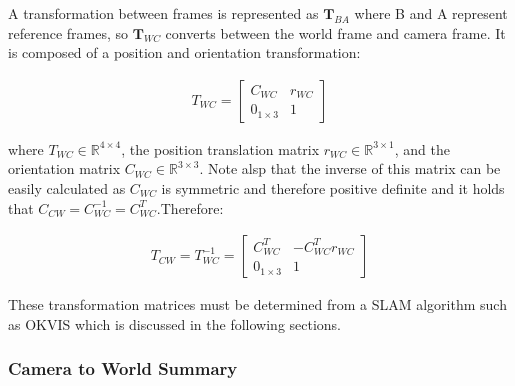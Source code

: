 \documentclass[a4paper,11pt,notitlepage]{article}
\begin{document}
A transformation between frames is represented as $\textbf{T}_{BA}$ where B and A represent reference frames, so $\textbf{T}_{WC}$ converts between the world frame and camera frame. It is composed of a position and orientation transformation:

\begin{equation}
\begin{aligned}
T_{WC} = 
\begin{bmatrix}
C_{WC} & r_{WC} \\
0_{1 \times 3} & 1
\end{bmatrix}
\end{aligned}
\end{equation}

where $T_{WC} \in \mathbb{R}^{4 \times 4}$, the position translation matrix $r_{WC} \in \mathbb{R}^{3 \times 1}$, and the orientation matrix $C_{WC} \in \mathbb{R}^{3 \times 3}$. Note alsp that the inverse of this matrix can be easily calculated as $C_{WC}$ is symmetric and therefore positive definite and it holds that $C_{CW}=C_{WC}^{-1}= C_{WC}^{T}$.Therefore:

\begin{equation}
\begin{aligned}
T_{CW} = T_{WC}^{-1} = 
\begin{bmatrix}
C_{WC}^{T} & -C_{WC}^{T}r_{WC} \\
0_{1 \times 3} & 1
\end{bmatrix}
\end{aligned}
\label{invert_tmatrix}
\end{equation}

These transformation matrices must be determined from a SLAM algorithm such as OKVIS which is discussed in the following sections.

\subsubsection{Camera to World Summary}
\end{document}
